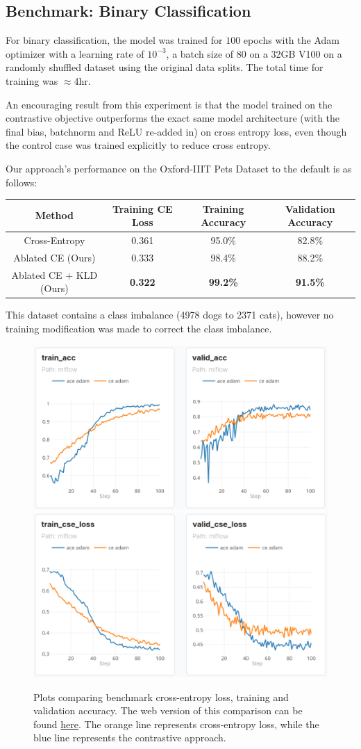 \documentclass{article}
\begin{document}
\subsection{Benchmark: Binary Classification}

For binary classification, the model was trained for $100$ epochs with the Adam optimizer with a learning rate of $10^{-3}$, a batch size of $80$ on a 32GB V100 on a randomly shuffled dataset using the original data splits. The total time for training was $\approx$4hr.

An encouraging result from this experiment is that the model trained on the contrastive objective outperforms the exact same model architecture (with the final bias, batchnorm and ReLU re-added in) on cross entropy loss, even though the control case was trained explicitly to reduce cross entropy.

Our approach's performance on the Oxford-IIIT Pets Dataset to the default is as follows:

\begin{table}[h]
	\centering
	\begin{tabular}{c|ccc}
		\toprule
		\textbf{Method}  & \textbf{Training CE Loss}  & \textbf{Training Accuracy}   & \textbf{Validation Accuracy} \\
		\midrule
		Cross-Entropy & 0.361 & 95.0\% & 82.8\% \\
		Ablated CE (Ours) & 0.333 & 98.4\% & 88.2\% \\
		Ablated CE + KLD (Ours) & \bf 0.322 & \bf 99.2\% & \bf 91.5\% \\
		\bottomrule
	\end{tabular}
\end{table}

This dataset contains a class imbalance (4978 dogs to 2371 cats), however no training modification was made to correct the class imbalance.

\begin{figure}[H]
	\centering
	\includegraphics[width=.4\textwidth]{img/accuracy.png}
	\hspace{4em}
	\includegraphics[width=.4\textwidth]{img/loss.png}
	\caption{Plots comparing benchmark cross-entropy loss, training and validation accuracy. The web version of this comparison can be found \href{https://dagshub.com/jinensetpal/contrastive-optimization/experiments\#/compare?experiments=[\%22m_cea5cf4fcbbb4c3f984b2396927cf80c\%22,\%22m_101287828f604122a092a2501ec3facb\%22]}{here}. The orange line represents cross-entropy loss, while the blue line represents the contrastive approach.}
\end{figure}
\end{document}
